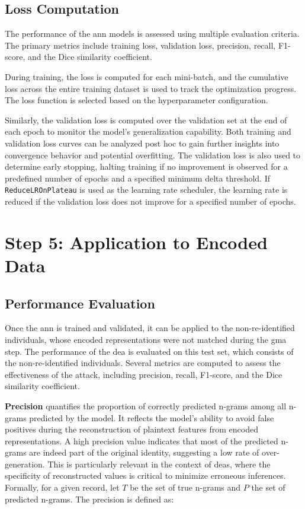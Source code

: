 \subsection{Loss Computation}

The performance of the \ac{ann} models is assessed using multiple evaluation criteria.
The primary metrics include training loss, validation loss, precision, recall, F1-score, and the Dice similarity coefficient.

During training, the loss is computed for each mini-batch, and the cumulative loss across the entire training dataset is used to track the optimization progress.
The loss function is selected based on the hyperparameter configuration.

Similarly, the validation loss is computed over the validation set at the end of each epoch to monitor the model's generalization capability.
Both training and validation loss curves can be analyzed post hoc to gain further insights into convergence behavior and potential overfitting.
The validation loss is also used to determine early stopping, halting training if no improvement is observed for a predefined number of epochs and a specified minimum delta threshold.
If \texttt{ReduceLROnPlateau} is used as the learning rate scheduler, the learning rate is reduced if the validation loss does not improve for a specified number of epochs.

\section{Step 5: Application to Encoded Data} \label{sec:application}

\subsection{Performance Evaluation}

Once the \ac{ann} is trained and validated, it can be applied to the non-re-identified individuals, whose encoded representations were not matched during the \ac{gma} step.
The performance of the \ac{dea} is evaluated on this test set, which consists of the non-re-identified individuals.
Several metrics are computed to assess the effectiveness of the attack, including precision, recall, F1-score, and the Dice similarity coefficient.

\textbf{Precision} quantifies the proportion of correctly predicted n-grams among all n-grams predicted by the model.
It reflects the model’s ability to avoid false positives during the reconstruction of plaintext features from encoded representations.
A high precision value indicates that most of the predicted n-grams are indeed part of the original identity, suggesting a low rate of over-generation.
This is particularly relevant in the context of \ac{dea}s, where the specificity of reconstructed values is critical to minimize erroneous inferences.
Formally, for a given record, let $T$ be the set of true n-grams and $P$ the set of predicted n-grams.
The precision is defined as:

